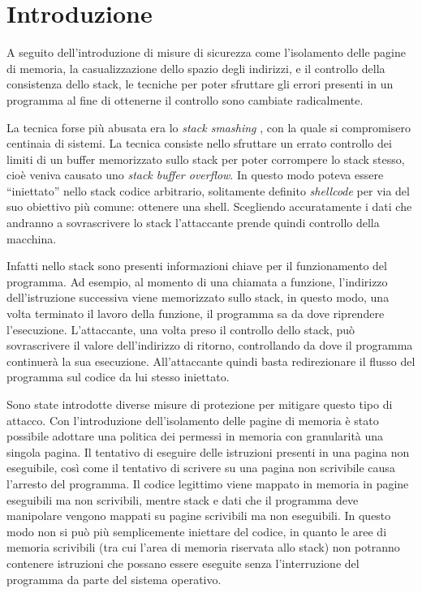 \thispagestyle{empty}

\chapter*{Introduzione}


A seguito dell'introduzione di misure di sicurezza come l'isolamento
delle pagine di memoria, la casualizzazione dello spazio degli
indirizzi, e il controllo della consistenza dello stack, le tecniche
per poter sfruttare gli errori presenti in un programma al fine di
ottenerne il controllo sono cambiate radicalmente.

La tecnica forse più abusata era lo \emph{stack smashing}
\cite{Phrack-96}, con la quale si compromisero centinaia di
sistemi. La tecnica consiste nello sfruttare un errato controllo dei
limiti di un buffer memorizzato sullo stack per poter corrompere lo
stack stesso, cioè veniva causato uno \emph{stack buffer overflow}. In
questo modo poteva essere ``iniettato'' nello stack codice arbitrario,
solitamente definito \emph{shellcode} per via del suo obiettivo più
comune: ottenere una shell. Scegliendo accuratamente i dati che
andranno a sovrascrivere lo stack l'attaccante prende quindi controllo
della macchina.

Infatti nello stack sono presenti informazioni chiave per il
funzionamento del programma. Ad esempio, al momento di una chiamata a
funzione, l'indirizzo dell'istruzione successiva viene memorizzato
sullo stack, in questo modo, una volta terminato il lavoro della
funzione, il programma sa da dove riprendere
l'esecuzione. L'attaccante, una volta preso il controllo dello stack,
può sovrascrivere il valore dell'indirizzo di ritorno, controllando da
dove il programma continuerà la sua esecuzione. All'attaccante quindi
basta redirezionare il flusso del programma sul codice da lui stesso
iniettato.

Sono state introdotte diverse misure di protezione per mitigare questo
tipo di attacco. Con l'introduzione dell'isolamento delle pagine di
memoria è stato possibile adottare una politica dei permessi in
memoria con granularità una singola pagina. Il tentativo di eseguire
delle istruzioni presenti in una pagina non eseguibile, così come il
tentativo di scrivere su una pagina non scrivibile causa l'arresto del
programma. Il codice legittimo viene mappato in memoria in pagine
eseguibili ma non scrivibili, mentre stack e dati che il programma
deve manipolare vengono mappati su pagine scrivibili ma non
eseguibili. In questo modo non si può più semplicemente iniettare del
codice, in quanto le aree di memoria scrivibili (tra cui l'area di
memoria riservata allo stack) non potranno contenere istruzioni che
possano essere eseguite senza l'interruzione del programma da parte
del sistema operativo. 

